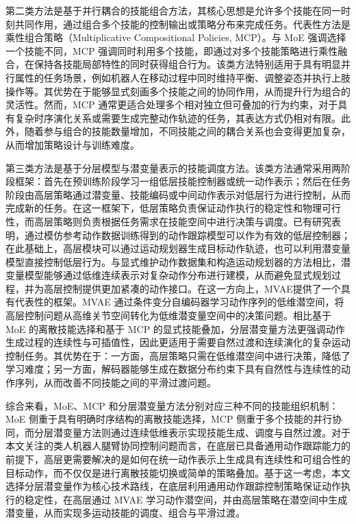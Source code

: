 第二类方法是基于并行耦合的技能组合方法，其核心思想是允许多个技能在同一时刻共同作用，通过组合多个技能的控制输出或策略分布来完成任务。代表性方法是乘性组合策略（Multiplicative Compositional Policies, MCP）\cite{peng2019mcp}。与 MoE 强调选择一个技能不同，MCP 强调同时利用多个技能，即通过对多个技能策略进行乘性融合，在保持各技能局部特性的同时获得组合行为。该类方法特别适用于具有明显并行属性的任务场景，例如机器人在移动过程中同时维持平衡、调整姿态并执行上肢操作等。其优势在于能够显式刻画多个技能之间的协同作用，从而提升行为组合的灵活性。然而，MCP 通常更适合处理多个相对独立但可叠加的行为约束，对于具有复杂时序演化关系或需要生成完整动作轨迹的任务，其表达方式仍相对有限。此外，随着参与组合的技能数量增加，不同技能之间的耦合关系也会变得更加复杂，从而增加策略设计与训练难度。

第三类方法是基于分层模型与潜变量表示的技能调度方法。该类方法通常采用两阶段框架：首先在预训练阶段学习一组低层技能控制器或统一动作表示；然后在任务阶段由高层策略通过潜变量、技能编码或中间动作表示对低层行为进行控制，从而完成新的任务\cite{coros2010generalized,hausman2018learning,heess2015learning,wu2010terrain,faloutsos2001composable,ling2020character,mordatch2012discovery,peng2017deeploco,laszlo2000interactive}。在这一框架下，低层策略负责保证动作执行的稳定性和物理可行性，而高层策略则负责根据任务需求在技能空间中进行决策与调度。已有研究表明，通过模仿参考动作数据训练得到的动作跟踪模型可以作为有效的低层控制器\cite{won2020scalable}；在此基础上，高层模块可以通过运动规划器生成目标动作轨迹\cite{park2019learning}，也可以利用潜变量模型直接控制低层行为\cite{hasenclever2020comic,luo2020carl,lynch2020learning}。与显式维护动作数据集和构造运动规划器的方法相比，潜变量模型能够通过低维连续表示对复杂动作分布进行建模，从而避免显式规划过程，并为高层控制提供更加紧凑的动作接口。在这一方向上，MVAE提供了一个具有代表性的框架。MVAE 通过条件变分自编码器学习动作序列的低维潜空间，将高层控制问题从高维关节空间转化为低维潜变量空间中的决策问题。相比基于 MoE 的离散技能选择和基于 MCP 的显式技能叠加，分层潜变量方法更强调动作生成过程的连续性与可插值性，因此更适用于需要自然过渡和连续演化的复杂运动控制任务。其优势在于：一方面，高层策略只需在低维潜空间中进行决策，降低了学习难度；另一方面，解码器能够生成在数据分布约束下具有自然性与连续性的动作序列，从而改善不同技能之间的平滑过渡问题。

综合来看，MoE、MCP 和分层潜变量方法分别对应三种不同的技能组织机制：MoE 侧重于具有明确时序结构的离散技能选择，MCP 侧重于多个技能的并行协同，而分层潜变量方法则通过连续低维表示实现技能生成、调度与自然过渡。对于本文关注的类人机器人腿臂协同控制问题而言，在底层已具备通用动作跟踪能力的前提下，高层更需要解决的是如何在统一动作表示上生成具有连续性和可组合性的目标动作，而不仅仅是进行离散技能切换或简单的策略叠加。基于这一考虑，本文选择分层潜变量作为核心技术路线，在底层利用通用动作跟踪控制策略保证动作执行的稳定性，在高层通过 MVAE 学习动作潜空间，并由高层策略在潜空间中生成潜变量，从而实现多运动技能的调度、组合与平滑过渡。

